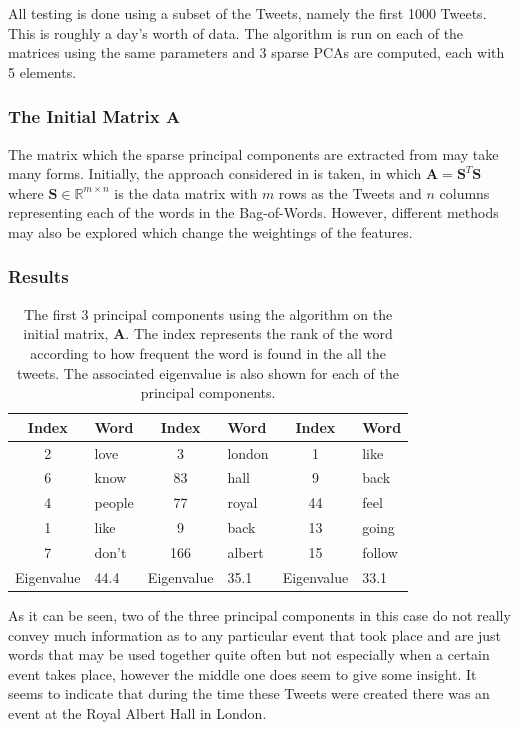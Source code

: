 \documentclass[11pt,a4paper]{article}
\begin{document}
All testing is done using a subset of the Tweets, namely the first 1000 Tweets. This is roughly a day's worth of data. The algorithm is run on each of the matrices using the same parameters and 3 sparse PCAs are computed, each with 5 elements.
\subsubsection{The Initial Matrix $\mathbf{A}$}
The matrix which the sparse principal components are extracted from may take many forms. Initially, the approach considered in \cite{dimakis} is taken, in which $\mathbf{A} = \mathbf{S}^T \mathbf{S}$ where $\mathbf{S} \in \mathbb{R}^{m \times n}$ is the data matrix with $m$ rows as the Tweets and $n$ columns representing each of the words in the Bag-of-Words. However, different methods may also be explored which change the weightings of the features. 

\subsubsection*{Results}
\begin{table}[H]
\center
\begin{tabular}{| c l | c l | c l |}
\hline
Index & Word & Index & Word & Index & Word\\
\hline
2 & love & 3 & london & 1 & like\\
6 & know & 83 & hall & 9 & back\\
4 & people & 77 & royal & 44 & feel\\
1 & like & 9 & back & 13 & going\\
7 & don't & 166 & albert & 15 & follow\\
\hline
Eigenvalue & 44.4 & Eigenvalue & 35.1 & Eigenvalue & 33.1\\
\hline
\end{tabular}
\caption{The first 3 principal components using the algorithm on the initial matrix, $ \mathbf{A}$. The index represents the rank of the word according to how frequent the word is found in the all the tweets. The associated eigenvalue is also shown for each of the principal components.}
\end{table}

As it can be seen, two of the three principal components in this case do not really convey much information as to any particular event that took place and are just words that may be used together quite often but not especially when a certain event takes place, however the middle one does seem to give some insight. It seems to indicate that during the time these Tweets were created there was an event at the Royal Albert Hall in London. 
\end{document}
